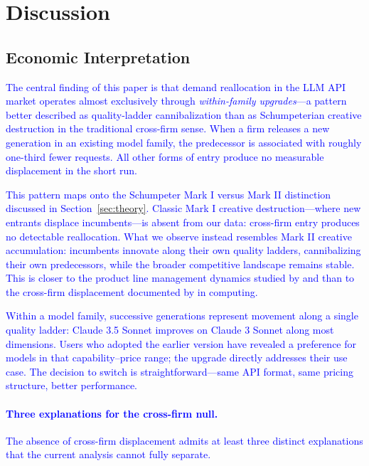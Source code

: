 \documentclass[11pt, a4paper]{article}
\begin{document}
\section{Discussion}
\label{sec:discussion}

\subsection{Economic Interpretation}

\textcolor{blue}{The central finding of this paper is that demand reallocation in the LLM API market operates almost exclusively through \emph{within-family upgrades}---a pattern better described as quality-ladder cannibalization than as Schumpeterian creative destruction in the traditional cross-firm sense. When a firm releases a new generation in an existing model family, the predecessor is associated with roughly one-third fewer requests. All other forms of entry produce no measurable displacement in the short run.}

\textcolor{blue}{This pattern maps onto the Schumpeter Mark I versus Mark II distinction discussed in Section~\ref{sec:theory}. Classic Mark I creative destruction---where new entrants displace incumbents---is absent from our data: cross-firm entry produces no detectable reallocation. What we observe instead resembles Mark II creative accumulation: incumbents innovate along their own quality ladders, cannibalizing their own predecessors, while the broader competitive landscape remains stable. This is closer to the product line management dynamics studied by \citet{desai2001product} and \citet{draganska2005product} than to the cross-firm displacement documented by \citet{bresnahan1999technological} in computing.}

\textcolor{blue}{Within a model family, successive generations represent movement along a single quality ladder: Claude 3.5 Sonnet improves on Claude 3 Sonnet along most dimensions. Users who adopted the earlier version have revealed a preference for models in that capability--price range; the upgrade directly addresses their use case. The decision to switch is straightforward---same API format, same pricing structure, better performance.}

\textcolor{blue}{\paragraph{Three explanations for the cross-firm null.} The absence of cross-firm displacement admits at least three distinct explanations that the current analysis cannot fully separate.}
\end{document}
